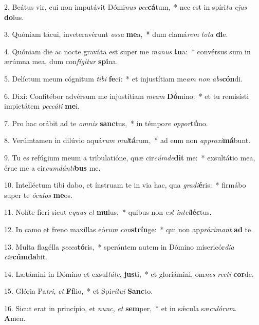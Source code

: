 2. Beátus vir, cui non imputávit Dómi\textit{nus} \textit{pec}\textbf{cá}tum,~*  nec est in spíri\textit{tu} \textit{e}\textit{jus} \textbf{do}lus.\

3. Quóniam tácui, inveteravérunt \textit{os}\textit{sa} \textbf{me}a,~*  dum clamá\textit{rem} \textit{to}\textit{ta} \textbf{di}e.\

4. Quóniam die ac nocte graváta est super me \textit{ma}\textit{nus} \textbf{tu}a:~*  convérsus sum in ærúmna mea, dum con\textit{fí}\textit{gi}\textit{tur} \textbf{spi}na.\

5. Delíctum meum cógnitum \textit{ti}\textit{bi} \textbf{fe}ci:~*  et injustítiam me\textit{am} \textit{non} \textit{abs}\textbf{cón}di.\

6. Dixi: Confitébor advérsum me injustítiam \textit{me}\textit{am} \textbf{Dó}mino:~*  et tu remisísti impietátem \textit{pec}\textit{cá}\textit{ti} \textbf{me}i.\

7. Pro hac orábit ad te \textit{om}\textit{nis} \textbf{sanc}tus,~*  in témpo\textit{re} \textit{op}\textit{por}\textbf{tú}no.\

8. Verúmtamen in dilúvio aquá\textit{rum} \textit{mul}\textbf{tá}rum,~*  ad eum non \textit{ap}\textit{pro}\textit{xi}\textbf{má}bunt.\

9. Tu es refúgium meum a tribulatióne, quæ cir\textit{cúm}\textit{de}\textbf{dit} me:~*  exsultátio mea, érue me a cir\textit{cum}\textit{dán}\textit{ti}\textbf{bus} me.\

10. Intelléctum tibi dabo, et ínstruam te in via hac, qua \textit{gra}\textit{di}\textbf{é}ris:~*  firmábo super te \textit{ó}\textit{cu}\textit{los} \textbf{me}os.\

11. Nolíte fíeri sicut e\textit{quus} \textit{et} \textbf{mu}lus,~*  quibus non \textit{est} \textit{in}\textit{tel}\textbf{léc}tus.\

12. In camo et freno maxíllas eó\textit{rum} \textit{con}\textbf{strín}ge:~*  qui non ap\textit{pró}\textit{xi}\textit{mant} \textbf{ad} te.\

13. Multa flagélla \textit{pec}\textit{ca}\textbf{tó}ris,~*  sperántem autem in Dómino misericór\textit{di}\textit{a} \textit{cir}\textbf{cúm}\textbf{da}bit.\

14. Lætámini in Dómino et exsul\textit{tá}\textit{te}, \textbf{jus}ti,~*  et gloriámini, om\textit{nes} \textit{rec}\textit{ti} \textbf{cor}de.\

15. Glória Pa\textit{tri}, \textit{et} \textbf{Fí}lio,~*  et Spi\textit{rí}\textit{tu}\textit{i} \textbf{Sanc}to.\

16. Sicut erat in princípio, et \textit{nunc}, \textit{et} \textbf{sem}per,~*  et in sǽcula sæ\textit{cu}\textit{ló}\textit{rum}. \textbf{A}men.\


